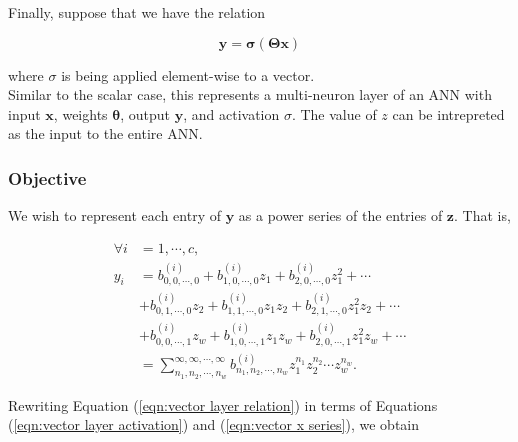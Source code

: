 Finally, suppose that we have the relation

\begin{equation}
    \mathbf{y} = \mathbf{\sigma}(\mathbf{\Theta} \mathbf{x})
    \label{eqn:vector layer relation}
\end{equation}

where $\sigma$ is being applied element-wise to a vector.\\

Similar to the scalar case, this represents a multi-neuron layer of an ANN with input $\mathbf{x}$, weights $\mathbf{\theta}$, output $\mathbf{y}$, and activation $\sigma$. The value of $z$ can be intrepreted as the input to the entire ANN.

\subsubsection{Objective}
We wish to represent each entry of $\mathbf{y}$ as a power series of the entries of $\mathbf{z}$. That is,

\begin{align}
    \forall i &= 1, \cdots, c, \nonumber \\ y_i
    &= b^{(i)}_{0,0,\cdots,0} + b^{(i)}_{1,0,\cdots,0} z_1 + b^{(i)}_{2,0,\cdots,0} z_1^2 + \cdots \nonumber \\
    &+ b^{(i)}_{0,1,\cdots,0} z_2 + b^{(i)}_{1,1,\cdots,0} z_1 z_2 + b^{(i)}_{2,1,\cdots,0} z_1^2 z_2 + \cdots \nonumber \\
    &+ b^{(i)}_{0,0,\cdots,1} z_w + b^{(i)}_{1,0,\cdots,1} z_1 z_w + b^{(i)}_{2,0,\cdots,1} z_1^2 z_w + \cdots \nonumber \\
    &= \sum_{n_1,n_2,\cdots,n_w}^{\infty,\infty,\cdots,\infty} b^{(i)}_{n_1,n_2,\cdots,n_w} z_1^{n_1} z_2^{n_2} \cdots z_w^{n_w}.
    \label{eqn:vector y series}
\end{align}

Rewriting Equation (\ref{eqn:vector layer relation}) in terms of Equations (\ref{eqn:vector layer activation}) and (\ref{eqn:vector x series}), we obtain

